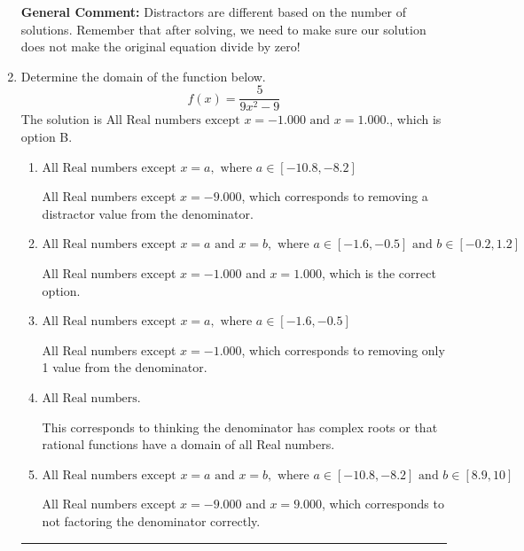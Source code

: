 \documentclass{extbook}[14pt]
\newcommand{\litem}[1]{\item #1

\rule{\textwidth}{0.4pt}}
\begin{document}
\begin{enumerate}
{\begin{enumerate}[label=\Alph*.]
\end{enumerate}

\textbf{General Comment:} Distractors are different based on the number of solutions. Remember that after solving, we need to make sure our solution does not make the original equation divide by zero!
}
\litem{
Determine the domain of the function below.
\[ f(x) = \frac{5}{9x^{2} -9} \]The solution is \( \text{All Real numbers except } x = -1.000 \text{ and } x = 1.000. \), which is option B.\begin{enumerate}[label=\Alph*.]
\item \( \text{All Real numbers except } x = a, \text{ where } a \in [-10.8, -8.2] \)

All Real numbers except $x = -9.000$, which corresponds to removing a distractor value from the denominator.
\item \( \text{All Real numbers except } x = a \text{ and } x = b, \text{ where } a \in [-1.6, -0.5] \text{ and } b \in [-0.2, 1.2] \)

All Real numbers except $x = -1.000$ and $x = 1.000$, which is the correct option.
\item \( \text{All Real numbers except } x = a, \text{ where } a \in [-1.6, -0.5] \)

All Real numbers except $x = -1.000$, which corresponds to removing only 1 value from the denominator.
\item \( \text{All Real numbers.} \)

This corresponds to thinking the denominator has complex roots or that rational functions have a domain of all Real numbers.
\item \( \text{All Real numbers except } x = a \text{ and } x = b, \text{ where } a \in [-10.8, -8.2] \text{ and } b \in [8.9, 10] \)

All Real numbers except $x = -9.000$ and $x = 9.000$, which corresponds to not factoring the denominator correctly.
\end{enumerate}

}
\end{enumerate}
\end{document}
